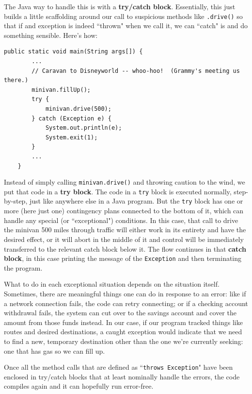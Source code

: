 The Java way to handle this is with a \textbf{try/catch block}. Essentially,
this just builds a little scaffolding around our call to suspicious methods
like \texttt{.drive()} so that if and exception is indeed ``thrown" when we
call it, we can ``catch" is and do something sensible. Here's how:

\begin{Verbatim}[samepage=true,fontsize=\footnotesize,frame=single]
    public static void main(String args[]) {
        ...
        // Caravan to Disneyworld -- whoo-hoo!  (Grammy's meeting us there.)
        minivan.fillUp();
        try {
            minivan.drive(500);
        } catch (Exception e) {
            System.out.println(e);
            System.exit(1);
        }
        ...
    }
\end{Verbatim}

Instead of simply calling \texttt{minivan.drive()} and throwing caution to the
wind, we put that code in a \textbf{try block}. The code in a \texttt{try}
block is executed normally, step-by-step, just like anywhere else in a Java
program. But the \texttt{try} block has one or more (here just one)
contingency plans connected to the bottom of it, which can handle any special
(or ``exceptional") conditions. In this case, that call to drive the minivan
500 miles through traffic will either work in its entirety and have the
desired effect, or it will abort in the middle of it and control will be
immediately transferred to the relevant catch block below it. The flow
continues in that \textbf{catch block}, in this case printing the message of
the \texttt{Exception} and then terminating the program.

What to do in each exceptional situation depends on the situation itself.
Sometimes, there are meaningful things one can do in response to an error:
like if a network connection fails, the code can retry connecting; or if a
checking account withdrawal fails, the system can cut over to the savings
account and cover the amount from those funds instead. In our case, if our
program tracked things like routes and desired destinations, a caught
exception would indicate that we need to find a new, temporary destination
other than the one we're currently seeking: one that has gas so we can fill
up.

Once all the method calls that are defined as ``\texttt{throws Exception}"
have been enclosed in try/catch blocks that at least nominally handle the
errors, the code compiles again and it can hopefully run error-free.

